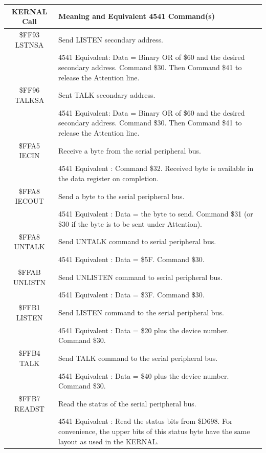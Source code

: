 \begin{center}
    \begin{longtable}{|c|L{8cm}|}
        \hline
        \textbf{KERNAL Call} & \textbf{Meaning and Equivalent 4541 Command(s)}\\
        \hline
        \endhead
        \$FF93 LSTNSA & Send LISTEN secondary address.  \\
         & 4541 Equivalent: Data = Binary OR of \$60 and the desired
        secondary address.  Command \$30. Then Command \$41 to release
        the Attention line. \\
        \hline
        \$FF96 TALKSA & Sent TALK secondary address.  \\
         & 4541 Equivalent: Data = Binary OR of \$60 and the desired
        secondary address.  Command \$30. Then Command \$41 to release
        the Attention line. \\
        \hline
        \$FFA5 IECIN & Receive a byte from the serial peripheral bus.  \\
         & 4541 Equivalent : Command \$32. Received byte is available
        in the data register on completion.  \\
        \hline
        \$FFA8 IECOUT & Send a byte to the serial peripheral bus.  \\
         & 4541 Equivalent : Data = the byte to send. Command \$31 (or \$30 if the byte is to
        be sent under Attention). \\
        \hline
        \$FFA8 UNTALK  & Send UNTALK command to serial peripheral bus.  \\
        & 4541 Equivalent : Data = \$5F. Command \$30. \\
        \hline
        \$FFAB UNLISTN  & Send UNLISTEN command to serial peripheral bus.  \\
        & 4541 Equivalent : Data = \$3F. Command \$30. \\
        \hline
        \$FFB1 LISTEN  & Send LISTEN command to the serial peripheral bus.  \\
        & 4541 Equivalent : Data = \$20 plus the device number. Command \$30. \\
        \hline
        \$FFB4 TALK  & Send TALK command to the serial peripheral bus.  \\
        & 4541 Equivalent : Data = \$40 plus the device number. Command \$30. \\
        \hline
        \$FFB7 READST & Read the status of the serial peripheral bus.  \\
        & 4541 Equivalent : Read the status bits from \$D698. For
        convenience, the
        upper bits of this status byte have the same layout as used in
        the KERNAL. \\
        \hline
    \end{longtable}
\end{center}

